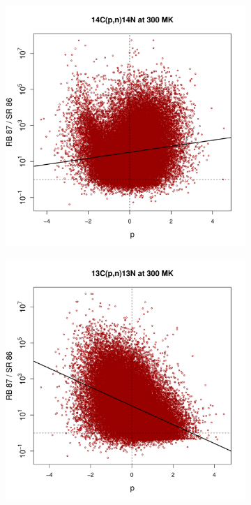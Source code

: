 \begin{figure}[!p]
\begin{subfigure}[b]{0.495\textwidth}
\end{subfigure}
\begin{subfigure}[b]{0.495\textwidth}   
\centering 
\includegraphics[width=\textwidth]{Chapter-3/figs/CorrRB87SR86_14C_p_n_14N_300MK.png}
\end{subfigure}
\hfill
\begin{subfigure}[b]{0.495\textwidth}   
\centering 
\includegraphics[width=\textwidth]{Chapter-3/figs/CorrRB87SR86_13C_p_n_13N_300MK.png}

\end{subfigure}
\end{figure}
